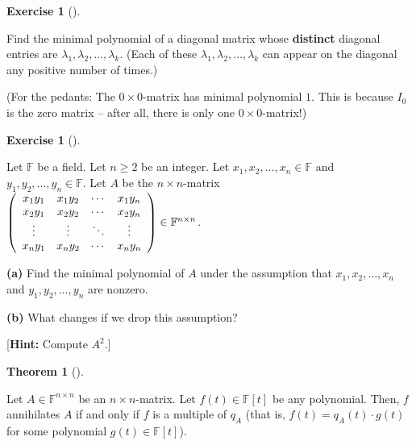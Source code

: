 \documentclass[numbers=enddot,12pt,final,onecolumn,notitlepage]{scrartcl}%
\newcounter{exer}
\numberwithin{exer}{subsection}
\theoremstyle{definition}
\newtheorem{theo}{Theorem}[subsection]
\newenvironment{theorem}[1][]
{\begin{theo}[#1]\begin{leftbar}}
{\end{leftbar}\end{theo}}
\newtheorem{exmp}[exer]{Exercise}
\newenvironment{exercise}[1][]
{\begin{exmp}[#1]\begin{leftbar}}
{\end{leftbar}\end{exmp}}
\begin{document}
\begin{exercise}
 Find the minimal polynomial of a diagonal matrix whose
\textbf{distinct} diagonal entries are $\lambda_{1},\lambda_{2},\ldots
,\lambda_{k}$. (Each of these $\lambda_{1},\lambda_{2},\ldots,\lambda_{k}$ can
appear on the diagonal any positive number of times.)
\end{exercise}

(For the pedants: The $0\times0$-matrix has minimal polynomial $1$. This is
because $I_{0}$ is the zero matrix -- after all, there is only one $0\times0$-matrix!)

\begin{exercise}
 Let $\mathbb{F}$ be a field. Let $n\geq2$ be an integer. Let
$x_{1},x_{2},\ldots,x_{n}\in\mathbb{F}$ and $y_{1},y_{2},\ldots,y_{n}%
\in\mathbb{F}$. Let $A$ be the $n\times n$-matrix $\left(
\begin{array}
[c]{cccc}%
x_{1}y_{1} & x_{1}y_{2} & \cdots & x_{1}y_{n}\\
x_{2}y_{1} & x_{2}y_{2} & \cdots & x_{2}y_{n}\\
\vdots & \vdots & \ddots & \vdots\\
x_{n}y_{1} & x_{n}y_{2} & \cdots & x_{n}y_{n}%
\end{array}
\right)  \in\mathbb{F}^{n\times n}$. \medskip

\textbf{(a)} Find the minimal polynomial of $A$ under the assumption that
$x_{1},x_{2},\ldots,x_{n}$ and $y_{1},y_{2},\ldots,y_{n}$ are nonzero.
\medskip

\textbf{(b)} What changes if we drop this assumption? \medskip

[\textbf{Hint:} Compute $A^{2}$.]
\end{exercise}

\begin{theorem}
\label{thm.jnf.mipo.annih-iff-mult}Let $A\in\mathbb{F}^{n\times n}$ be an
$n\times n$-matrix. Let $f\left(  t\right)  \in\mathbb{F}\left[  t\right]  $
be any polynomial. Then, $f$ annihilates $A$ if and only if $f$ is a multiple
of $q_{A}$ (that is, $f\left(  t\right)  =q_{A}\left(  t\right)  \cdot
g\left(  t\right)  $ for some polynomial $g\left(  t\right)  \in
\mathbb{F}\left[  t\right]  $).
\end{theorem}
\end{document}
